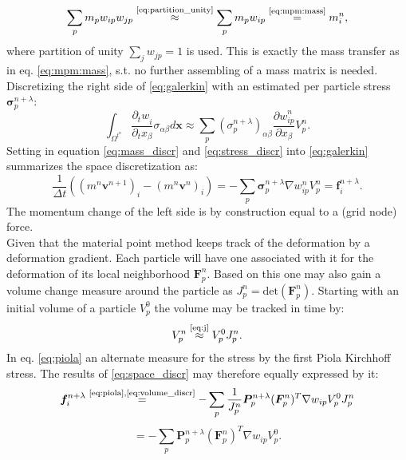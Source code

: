 \documentclass[m,times]{cgMA}
\begin{document}
\begin{equation}\label{eq:mass_discr}
\sum _ {  { p } }  { m } _ {  { p } }  { w } _ {ip}   w_{jp}
\stackrel{\text{\ref{eq:partition_unity}}}{\approx}
\sum_p m_p w_{ip}
\stackrel{\text{\ref{eq:mpm:mass}}}{=}
m_i^n,
\end{equation}
where partition of unity $\sum_j w_{jp} = 1$ is used. This is exactly the mass transfer as in eq. \ref{eq:mpm:mass}, s.t. no further assembling of a mass matrix is needed.
Discretizing the right side of \ref{eq:galerkin} with an estimated per particle stress $\boldsymbol{\sigma}_p^{n+\lambda}$:
\begin{equation}\label{eq:stress_discr}
\int _ { \Omega ^ {  t^ n } }   \frac{\partial{_t w } _ { {i  }}}{\partial_tx_\beta }  \sigma _ {{ \alpha } \beta }  { d } \boldsymbol { x } \approx
\sum _ { p } (\sigma _ { p }^{n+\lambda}) _ { \alpha \beta } \frac{{ \partial w } _ { {ip}}^n}{ \partial x_\beta }  V _ { p } ^ { n }.
\end{equation}
Setting in equation \ref{eq:mass_discr} and \ref{eq:stress_discr} into \ref{eq:galerkin} summarizes the space discretization as:
\begin{equation}\label{eq:space_discr}
  \frac{1}{\Delta t} (({m^n\boldsymbol{v}^{n+1}})_i-({m^n\boldsymbol{v}^n})_i) =
  -\sum _ { p } \boldsymbol{\sigma} _ { p }^{n+\lambda} \nabla w_{ip}^n V _ { p } ^ { n }
  = \boldsymbol{f}_i^{n+\lambda}.
\end{equation}
The momentum change of the left side is by construction equal to a (grid node) force.\\
Given that the material point method keeps track of the deformation by a deformation gradient. Each particle will have one associated with it for the deformation of its local neighborhood $\boldsymbol{F}^n_p$. Based on this one may also gain a volume change measure around the particle as $J^n_p = \text{det}(\boldsymbol{F}^n_p)$. Starting with an initial volume of a particle $V_p^0$ the volume may be tracked in time by:
\begin{equation}\label{eq:volume_discr}
  V^n_p \stackrel{\text{\ref{eq:j}}}{\approx} V_p^0J^n_p.
\end{equation}
In eq. \ref{eq:piola} an alternate measure for the stress by the first Piola Kirchhoff stress. The results of \ref{eq:space_discr} may therefore equally expressed by it:
$$
\boldsymbol{f}^{n+\lambda}_i \stackrel{\text{\ref{eq:piola},\ref{eq:volume_discr}}}{=}
- \sum_p \frac{1}{J^n_p}\boldsymbol{P}^{n+\lambda}_{p}(\boldsymbol{F}^{n}_{p})^T \nabla w_{ip}V^0_pJ^n_p
$$
\begin{equation}\label{eq:force_disc}
  = - \sum_p \boldsymbol{P}^{n+\lambda}_{p}(\boldsymbol{F}^{n}_{p})^T \nabla w_{ip}V^0_p.
\end{equation}
\cite{MPM:COURSE} \cite{MPM:APIC} \cite{bathe2006finite}
\end{document}
